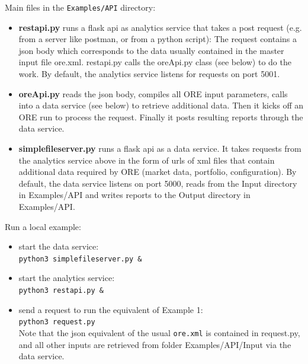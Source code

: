 \medskip
Main files in the {\tt Examples/API} directory:
\begin{itemize}
\item {\bf restapi.py} runs a flask api as analytics service that takes a post request
  (e.g. from a server like postman, or from a python script): The request contains a json body
  which corresponds to the data usually contained in the master input file ore.xml. restapi.py
  calls the oreApi.py class (see below) to do the work. By default, the analytics service listens for
  requests on port 5001.
\item {\bf oreApi.py} reads the json body, compiles all ORE input parameters, calls into a
  data service (see below) to retrieve additional data. Then it kicks off an ORE run to process
  the request.  Finally it posts resulting reports through the data service.
\item {\bf simplefileserver.py} runs a flask api as a data service. It takes requests from the
  analytics service above in the form of urls of xml files that contain additional data required
  by ORE (market data, portfolio, configuration). By default, the data service
  listens on port 5000, reads from the Input directory in Examples/API and writes reports to the Output
  directory in Examples/API.
\end{itemize}

\medskip
Run a local example:
\begin{itemize}
\item start the data service: \\
  {\tt python3 simplefileserver.py \&} 
\item start the analytics service: \\
  {\tt python3 restapi.py \&}
\item send a request to run the equivalent of Example 1: \\
  {\tt python3 request.py} \\
  Note that the json equivalent of the usual {\tt ore.xml} is contained in request.py,
  and all other inputs are retrieved from folder Examples/API/Input via the data service.
\end{itemize}

